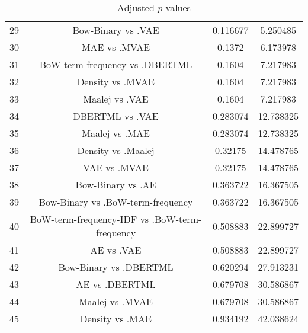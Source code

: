 \documentclass[a4paper,10pt]{article}
\begin{document}
\begin{landscape}
\begin{table}[!htp]
\begin{tabular}{cccc}
29&Bow-Binary vs .VAE&0.116677&5.250485\\
30&MAE vs .MVAE&0.1372&6.173978\\
31&BoW-term-frequency vs .DBERTML&0.1604&7.217983\\
32&Density vs .MVAE&0.1604&7.217983\\
33&Maalej vs .VAE&0.1604&7.217983\\
34&DBERTML vs .VAE&0.283074&12.738325\\
35&Maalej vs .MAE&0.283074&12.738325\\
36&Density vs .Maalej&0.32175&14.478765\\
37&VAE vs .MVAE&0.32175&14.478765\\
38&Bow-Binary vs .AE&0.363722&16.367505\\
39&Bow-Binary vs .BoW-term-frequency&0.363722&16.367505\\
40&BoW-term-frequency-IDF vs .BoW-term-frequency&0.508883&22.899727\\
41&AE vs .VAE&0.508883&22.899727\\
42&Bow-Binary vs .DBERTML&0.620294&27.913231\\
43&AE vs .DBERTML&0.679708&30.586867\\
44&Maalej vs .MVAE&0.679708&30.586867\\
45&Density vs .MAE&0.934192&42.038624\\
\hline
\end{tabular}
\caption{Adjusted $p$-values}
\end{table}

\end{landscape}
\end{document}
